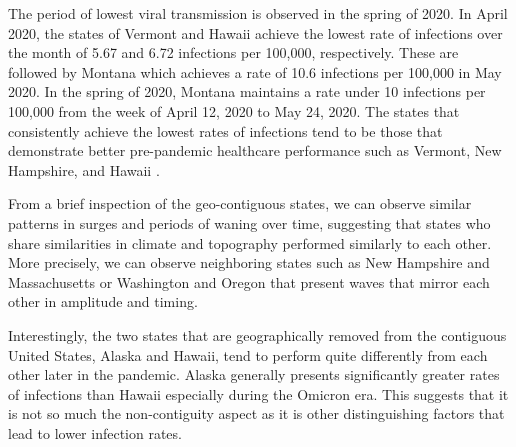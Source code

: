 \documentclass{article}
\newcommand{\attn }[1]{\textcolor{red}{ATTN: #1}}
\begin{document}
The period of lowest viral transmission is observed in the spring of 2020. In April 2020,
the states of Vermont and Hawaii achieve the lowest rate of infections 
over the month of 5.67 and 6.72 infections per 100,000, respectively. These are followed by
Montana which achieves a rate of 10.6 infections per 100,000 in May 2020. In the spring of
2020, Montana maintains a rate under 10 infections per 100,000 from the week of April 12, 2020 to 
May 24, 2020. The states that consistently achieve the lowest rates
of infections tend to be those that demonstrate better pre-pandemic healthcare performance such as 
Vermont, New Hampshire, and Hawaii \citep{radley2020}.

From a brief inspection of the geo-contiguous states, we can observe similar patterns in
surges and periods of waning over time, suggesting that states who share similarities in
climate and topography performed similarly to each other. More precisely, we can observe
neighboring states such as New Hampshire and Massachusetts or Washington and Oregon that
present waves that mirror each other in amplitude and timing. 

Interestingly, the two states that are geographically removed from the
contiguous United States, Alaska and Hawaii, tend to perform quite differently
from each other later in the pandemic. Alaska generally presents significantly greater rates of
infections than Hawaii especially during the Omicron era. This suggests that
it is not so much the non-contiguity aspect as it is other distinguishing
factors that lead to lower infection rates.

\end{document}
